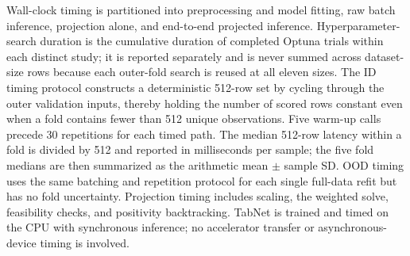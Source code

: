 \documentclass[a4paper,fleqn]{cas-sc}
\begin{document}
Wall-clock timing is partitioned into preprocessing and model fitting, raw batch inference, projection alone, and end-to-end projected inference. Hyperparameter-search duration is the cumulative duration of completed Optuna trials within each distinct study; it is reported separately and is never summed across dataset-size rows because each outer-fold search is reused at all eleven sizes. The ID timing protocol constructs a deterministic 512-row set by cycling through the outer validation inputs, thereby holding the number of scored rows constant even when a fold contains fewer than 512 unique observations. Five warm-up calls precede 30 repetitions for each timed path. The median 512-row latency within a fold is divided by 512 and reported in milliseconds per sample; the five fold medians are then summarized as the arithmetic mean $\pm$ sample SD. OOD timing uses the same batching and repetition protocol for each single full-data refit but has no fold uncertainty. Projection timing includes scaling, the weighted solve, feasibility checks, and positivity backtracking. TabNet is trained and timed on the CPU with synchronous inference; no accelerator transfer or asynchronous-device timing is involved.
\end{document}
